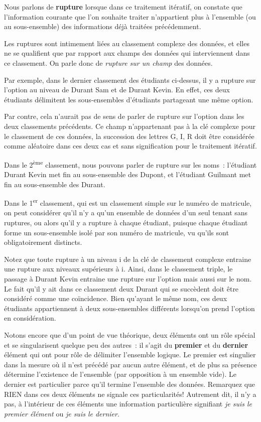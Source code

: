 Nous parlons de \textbf{rupture} lorsque dans ce traitement itératif, on
constate que l’information courante que l’on souhaite traiter
n’appartient plus à l’ensemble (ou au sous-ensemble) des informations
déjà traitées précédemment.

Les ruptures sont intimement liées au classement complexe des données,
et elles ne se qualifient que par rapport aux champs des données qui
interviennent dans ce classement. On parle donc de \textit{rupture sur
un champ} des données.

Par exemple, dans le dernier classement des étudiants ci-dessus, il y a
rupture sur l’option au niveau de Durant Sam et de Durant Kevin. En
effet, ces deux étudiants délimitent les sous-ensembles d’étudiants
partageant une même option.

Par contre, cela n’aurait pas de sens de parler de rupture sur l’option
dans les deux classements précédents. Ce champ n’appartenant pas à la
clé complexe pour le classement de ces données, la succession des
lettres G, I, R doit être considérée comme aléatoire dans ces deux cas
et sans signification pour le traitement itératif.

Dans le 2\textsuperscript{ème} classement, nous pouvons parler de
rupture sur les noms~: l’étudiant Durant Kevin met fin au sous-ensemble
des Dupont, et l’étudiant Guilmant met fin au sous-ensemble des Durant.


Dans le 1\textsuperscript{er} classement, qui est un classement simple
sur le numéro de matricule, on peut considérer qu’il n’y a qu’un
ensemble de données d’un seul tenant sans ruptures, ou alors qu’il y a
rupture à chaque étudiant, puisque chaque étudiant forme un
sous-ensemble isolé par son numéro de matricule, vu qu’ils sont
obligatoirement distincts.

Notez que toute rupture à un niveau i de la clé de classement complexe
entraine une rupture aux niveaux supérieurs à i. Ainsi, dans le
classement triple, le passage à Durant Kevin entraine une rupture sur
l’option mais aussi sur le nom. Le fait qu’il y ait dans ce classement
deux Durant qui se succèdent doit être considéré comme une coïncidence.
Bien qu’ayant le même nom, ces deux étudiants appartiennent à deux
sous-ensembles différents lorsqu’on prend l’option en considération.

Notons encore que d’un point de vue théorique, deux éléments ont un rôle
spécial et se singularisent quelque peu des autres~: il s’agit du
\textbf{premier} et du \textbf{dernier} élément qui ont pour rôle de
délimiter l’ensemble logique. Le premier est singulier dans la mesure
où il n’est précédé par aucun autre élément, et de plus sa présence
détermine l’existence de l’ensemble (par opposition à un ensemble
vide). Le dernier est particulier parce qu’il termine l’ensemble des
données. Remarquez que RIEN dans ces deux éléments ne signale ces
particularités! Autrement dit, il n’y a pas, à l’intérieur de ces
éléments une information particulière signifiant \textit{je suis le
premier élément} ou \textit{je suis le dernier}.


